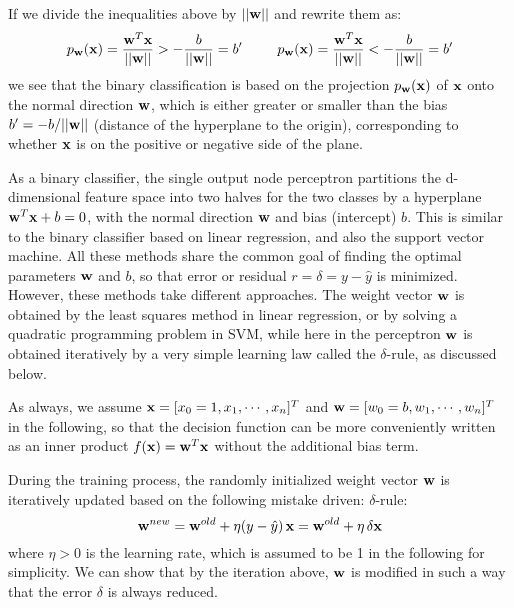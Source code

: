\documentclass{article}
\begin{document}
If we divide the inequalities above by $||{\bf w}||$ and rewrite 
them as:
\begin{equation}
  p_{\bf w}({\bf x})=\frac{{\bf w}^T{\bf x}}{||{\bf w}||}
  > -\frac{b}{||{\bf w}||}=b'\;\;\;\;\;\;\;\;\;
  p_{\bf w}({\bf x})=\frac{{\bf w}^T{\bf x}}{||{\bf w}||}
  < -\frac{b}{||{\bf w}||}=b'
\end{equation}
we see that the binary classification is based on the projection 
$p_{\bf w}({\bf x})$ of ${\bf x}$ onto the normal direction ${\bf w}$,
which is either greater or smaller than the bias $b'=-b/||{\bf w}||$
(distance of the hyperplane to the origin), corresponding to whether 
${\bf x}$ is on the positive or negative side of the plane.

As a binary classifier, the single output node perceptron partitions 
the d-dimensional feature space into two halves for the two classes by
a hyperplane ${\bf w}^T{\bf x}+b=0$, with the normal direction ${\bf w}$ 
and bias (intercept) $b$. This is similar to the binary classifier based 
on linear regression, and also the support vector machine. All these 
methods share the common goal of finding the optimal parameters ${\bf w}$
and $b$, so that error or residual $r=\delta=y-\hat{y}$ is minimized. 
However, these methods take different approaches. The weight vector 
${\bf w}$ is obtained by the least squares method in linear regression, 
or by solving a quadratic programming problem in SVM, while here in the
perceptron ${\bf w}$ is obtained iteratively by a very simple learning 
law called the $\delta$-rule, as discussed below. 

As always, we assume ${\bf x}=[x_0=1,x_1,\cdots,x_n]^T$ and 
${\bf w}=[w_0=b,w_1,\cdots,w_n]^T$ in the following, so that the 
decision function can be more conveniently written as an inner product 
$f({\bf x})={\bf w}^T{\bf x}$ without the additional bias term.

During the training process, the randomly initialized weight vector 
${\bf w}$ is iteratively updated based on the following mistake driven:
$\delta$-rule:
\begin{equation} 
  {\bf w}^{new}={\bf w}^{old}+\eta(y-\hat{y})\,{\bf x}
  ={\bf w}^{old}+\eta\,\delta{\bf x}
  \label{deltaRulePerceptron}
\end{equation}
where $\eta>0$ is the learning rate, which is assumed to be 1 in the
following for simplicity. We can show that by the iteration above, 
${\bf w}$ is modified in such a way that the error $\delta$ is always 
reduced.
\end{document}
